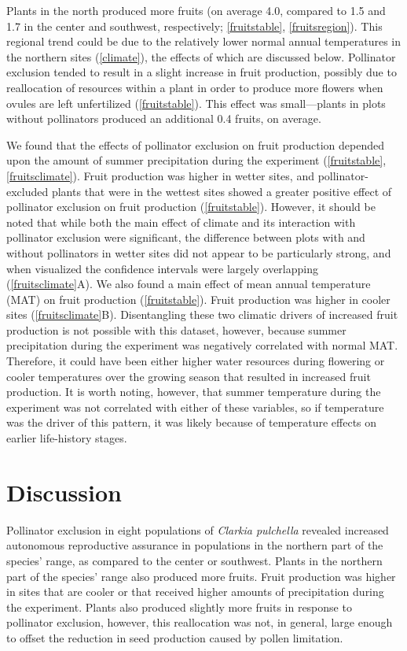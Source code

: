 \documentclass{article}
\begin{document}
Plants in the north produced more fruits (on average 4.0, compared to 1.5 and 1.7 in the center and southwest, respectively; \autoref{fruitstable}, \autoref{fruitsregion}). This regional trend could be due to the relatively lower normal annual temperatures in the northern sites (\autoref{climate}), the effects of which are discussed below. Pollinator exclusion tended to result in a slight increase in fruit production, possibly due to reallocation of resources within a plant in order to produce more flowers when ovules are left unfertilized (\autoref{fruitstable}). This effect was small---plants in plots without pollinators produced an additional 0.4 fruits, on average. 

We found that the effects of pollinator exclusion on fruit production depended upon the amount of summer precipitation during the experiment (\autoref{fruitstable}, \autoref{fruitsclimate}). Fruit production was higher in wetter sites, and pollinator-excluded plants that were in the wettest sites showed a greater positive effect of pollinator exclusion on fruit production (\autoref{fruitstable}). However, it should be noted that while both the main effect of climate and its interaction with pollinator exclusion were significant, the difference between plots with and without pollinators in wetter sites did not appear to be particularly strong, and when visualized the confidence intervals were largely overlapping (\autoref{fruitsclimate}A). We also found a main effect of mean annual temperature (MAT) on fruit production (\autoref{fruitstable}). Fruit production was higher in cooler sites (\autoref{fruitsclimate}B). Disentangling these two climatic drivers of increased fruit production is not possible with this dataset, however, because summer precipitation during the experiment was negatively correlated with normal MAT. Therefore, it could have been either higher water resources during flowering or cooler temperatures over the growing season that resulted in increased fruit production. It is worth noting, however, that summer temperature during the experiment was not correlated with either of these variables, so if temperature was the driver of this pattern, it was likely because of temperature effects on earlier life-history stages. 

\section*{Discussion}

Pollinator exclusion in eight populations of \textit{Clarkia pulchella} revealed increased autonomous reproductive assurance in populations in the northern part of the species' range, as compared to the center or southwest. Plants in the northern part of the species' range also produced more fruits. Fruit production was higher in sites that are cooler or that received higher amounts of precipitation during the experiment. Plants also produced slightly more fruits in response to pollinator exclusion, however, this reallocation was not, in general, large enough to offset the reduction in seed production caused by pollen limitation.
\end{document}

